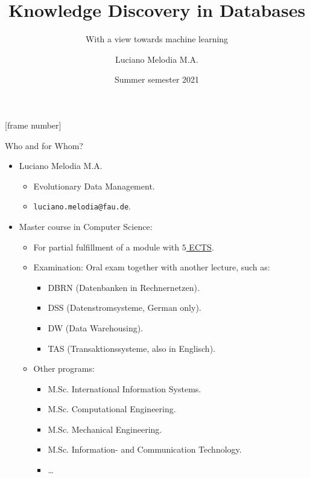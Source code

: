 \documentclass[aspectratio=169,t]{beamer}
\title[KDD]{Knowledge Discovery in Databases}
\subtitle{With a view towards machine learning}
\author[L.~Melodia]{Luciano Melodia M.A.}
\institute[Department]{Evolutionary Data Management, Friedrich-Alexander University Erlangen-Nürnberg}
\date{Summer semester 2021}
\begin{document}
\maketitle

{ %
	[frame number]
	\begin{frame}{Who and for Whom?}
		\begin{itemize}
			\item Luciano Melodia M.A.
			      \begin{itemize}
				      \item Evolutionary Data Management.
				      \item \texttt{luciano.melodia@fau.de}.
			      \end{itemize}
			\item Master course in Computer Science:
			      \begin{itemize}
				      \item For partial fulfillment of a module with \underline{$5$ ECTS}.
				      \item Examination: Oral exam together with another lecture, such as:
				            \begin{itemize}
					            \item DBRN (Datenbanken in Rechnernetzen).
					            \item DSS (Datenstromsysteme, German only).
					            \item DW (Data Warehousing).
					            \item TAS (Transaktionssysteme, also in Englisch).
				            \end{itemize}
				      \item Other programs:
				            \begin{itemize}
					            \item M.Sc. International Information Systems.
					            \item M.Sc. Computational Engineering.
					            \item M.Sc. Mechanical Engineering.
					            \item M.Sc. Information- and Communication Technology.
					            \item \ldots
				            \end{itemize}
			      \end{itemize}
		\end{itemize}
	\end{frame}
}
\end{document}
